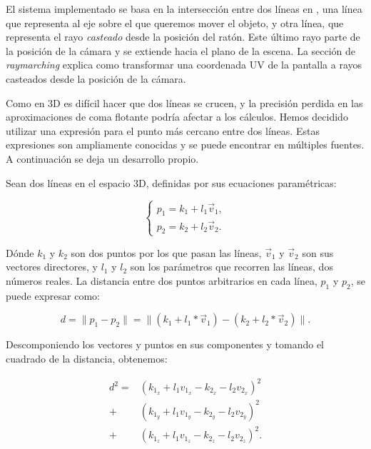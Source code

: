El sistema implementado se basa en la intersección entre dos líneas en
, una línea que representa al eje sobre el que queremos mover
el objeto, y otra línea, que representa el rayo \textit{casteado} desde la
posición del ratón. Este último rayo parte de la posición de la cámara y se
extiende hacia el plano de la escena. La sección de \textit{raymarching}
explica como transformar una coordenada UV de la pantalla a rayos casteados
desde la posición de la cámara.

Como en 3D es difícil hacer que dos líneas se crucen, y la precisión perdida en
las aproximaciones de coma flotante podría afectar a los cálculos. Hemos
decidido utilizar una expresión para el punto más cercano entre dos líneas.
Estas expresiones son ampliamente conocidas y se puede encontrar en múltiples
fuentes. A continuación se deja un desarrollo propio.

Sean dos líneas en el espacio 3D, definidas por sus ecuaciones paramétricas:

\begin{equation}
    \begin{cases}
        p_1 = k_1 + l_1  \vec{v}_1, \\
        p_2 = k_2 + l_2  \vec{v}_2.
    \end{cases}
\end{equation}

Dónde $k_1$ y $k_2$ son dos puntos por los que pasan las líneas, $\vec{v}_1$ y
$\vec{v}_2$ son sus vectores directores, y $l_1$ y $l_2$ son los parámetros que
recorren las líneas, dos números reales. La distancia entre dos puntos
arbitrarios en cada línea, $p_1$ y $p_2$, se puede expresar como:

\begin{equation}
    d = \| p_1 - p_2 \| = \| (k_1 + l_1 * \vec{v}_1) - (k_2 + l_2 * \vec{v}_2) \|.
\end{equation}

Descomponiendo los vectores y puntos en sus componentes y tomando el cuadrado
de la distancia, obtenemos:

\begin{equation}
    \begin{align}
        d^2 = & \left(k_{1_x} + l_1 v_{1_x} - k_{2_x} - l_2 v_{2_x}\right)^2  \\
        +     & \left(k_{1_y} + l_1 v_{1_y} - k_{2_y} - l_2 v_{2_y}\right)^2  \\
        +     & \left(k_{1_z} + l_1 v_{1_z} - k_{2_z} - l_2 v_{2_z}\right)^2.
    \end{align}
\end{equation}

